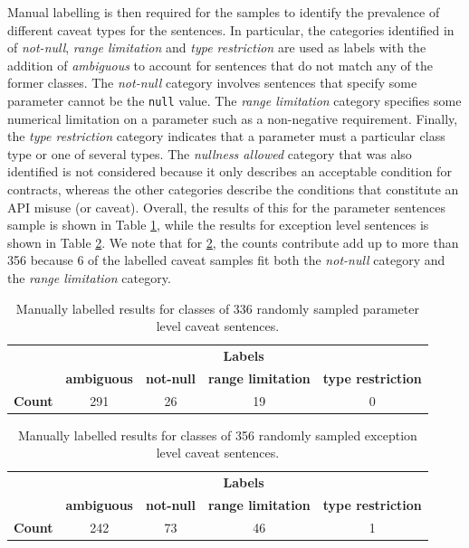 Manual labelling is then required for the samples to identify the prevalence of different caveat types for the sentences. In  particular, the categories identified in \cite{zhou-directive} of \textit{not-null}, \textit{range limitation} and \textit{type restriction} are used as labels with the addition of \textit{ambiguous} to account for sentences that do not match any of the former classes. The \textit{not-null} category involves sentences that specify some parameter cannot be the \lstinline{null} value. The \textit{range limitation} category specifies some numerical limitation on a parameter such as a non-negative requirement. Finally, the \textit{type restriction} category indicates that a parameter must a particular class type or one of several types. The \textit{nullness allowed} category that was also identified is not considered because it only describes an acceptable condition for contracts, whereas the other categories describe the conditions that constitute an API misuse (or caveat). Overall, the results of this for the parameter sentences sample is shown in Table \ref{tab:caveat-param-stats}, while the results for exception level sentences is shown in Table \ref{tab:caveat-exception-stats}. We note that for \ref{tab:caveat-exception-stats}, the counts contribute add up to more than 356 because 6 of the labelled caveat samples fit both the \textit{not-null} category and the \textit{range limitation} category. 

\begin{table}[h]
	\centering
	\begin{tabular}{|l|cccc|}
		\hline
		& \multicolumn{4}{c|}{\textbf{Labels}} \\ \cline{2-5} 
		& \textbf{ambiguous} & \textbf{not-null} & \textbf{range limitation} & \textbf{type restriction} \\ \hline
		\textbf{Count} & 291 & 26 & 19 & 0 \\ \hline
	\end{tabular}
	\caption{Manually labelled results for classes of 336 randomly sampled parameter level caveat sentences.}
	\label{tab:caveat-param-stats}
\end{table}

\begin{table}[h]
	\centering
	\begin{tabular}{|l|cccc|}
		\hline
		& \multicolumn{4}{c|}{\textbf{Labels}} \\ \cline{2-5} 
		& \textbf{ambiguous} & \textbf{not-null} & \textbf{range limitation} & \textbf{type restriction} \\ \hline
		\textbf{Count} & 242 & 73 & 46 & 1 \\ \hline
	\end{tabular}
	\caption{Manually labelled results for classes of 356 randomly sampled exception level caveat sentences.}
	\label{tab:caveat-exception-stats}
\end{table}

